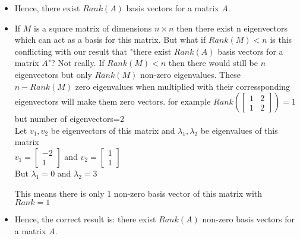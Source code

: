 \documentclass{article}
\begin{document}
\begin{itemize}
  \item Hence, there exist $Rank(A)$ basis vectors for a matrix $A$.
  \item If $M$ is a square matrix of dimensions $n\times n$ then there exist n eigenvectors which can act as a basis for this matrix.
        \subitem But what if $Rank(M)<n$
        \subitem is this conflicting with our result that "there exist $Rank(A)$ basis vectors for a matrix $A$"? Not really.
        \subitem If $Rank(M)<n$ then there would still be $n$ eigenvectors but only $Rank(M)$ non-zero eigenvalues.
        \subitem These $n-Rank(M)$ zero eigenvalues when multiplied with their corressponding eigenvectors will make them zero vectors.
        \subitem for example $Rank\left(\begin{bmatrix}
              1 & 2 \\
              1 & 2
            \end{bmatrix}\right)=1$ but number of eigenvectors=2\\
        Let $v_1,v_2$ be eigenvectors of this matrix and $\lambda_1,\lambda_2$ be eigenvalues of this matrix\\
        $v_1=\begin{bmatrix}
            -2 \\
            1
          \end{bmatrix}$ and  $v_2=\begin{bmatrix}
            1 \\
            1
          \end{bmatrix}$\\
        But
        $\lambda_1=0$ and
        $\lambda_2=3$

        This means there is only 1 non-zero basis vector of this matrix with $Rank=1$
  \item Hence, the correct result is: there exist $Rank(A)$ non-zero basis vectors for a matrix $A$.

\end{itemize}

\pagebreak
\end{document}

